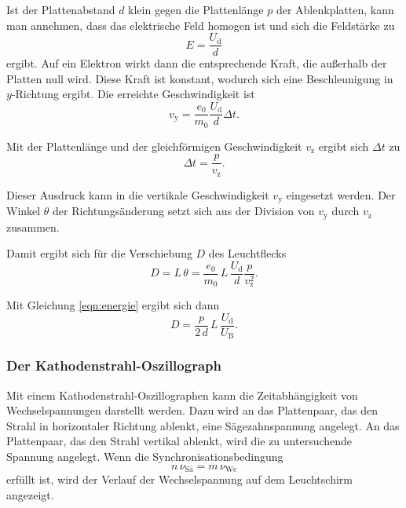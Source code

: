 \noindent Ist der Plattenabstand $d$ klein gegen die Plattenlänge $p$ 
der Ablenkplatten, kann man annehmen, dass das elektrische 
Feld homogen ist und sich die Feldstärke zu
\begin{equation*}
    E = \frac{U_\text{d}}{d}
\end{equation*} 
ergibt. Auf ein Elektron wirkt dann die entsprechende Kraft, 
die außerhalb der Platten null wird. Diese Kraft ist konstant, 
wodurch sich eine Beschleunigung in $y$-Richtung  
ergibt. 
Die erreichte Geschwindigkeit ist 
\begin{equation*}
    v_\text{y} = \frac{e_\text{0}}{m_\text{0}} \frac{U_\text{d}}{d} \Delta t.
\end{equation*}

\noindent Mit der Plattenlänge und der 
gleichförmigen Geschwindigkeit $v_\text{z}$ ergibt sich $\Delta t$ zu
\begin{equation*}
    \Delta t = \frac{p}{v_\text{z}}.
\end{equation*}

\noindent Dieser Ausdruck kann in die vertikale 
Geschwindigkeit $v_\text{y}$ eingesetzt werden. Der Winkel $\theta$ der 
Richtungsänderung setzt sich aus der Division von 
$v_\text{y}$ durch $v_\text{z}$ zusammen. 

\noindent Damit ergibt sich für die Verschiebung $D$ des Leuchtflecks 
\begin{equation*}
    D = L \, \theta = \frac{e_\text{0}}{m_\text{0}} \, L \, \frac{U_\text{d}}{d} \frac{p}{v_\text{z}^2}.
\end{equation*}

\noindent Mit Gleichung \eqref{eqn:energie} ergibt sich dann 
\begin{equation}
    D = \frac{p}{2\, d} \, L \, \frac{U_\text{d}}{U_\text{B}}.
    \label{eqn:leuchtfleck}
\end{equation}

\subsubsection{Der Kathodenstrahl-Oszillograph}
Mit einem Kathodenstrahl-Oszillographen kann die Zeitabhängigkeit
von Wechselspannungen darstellt werden.
Dazu wird an das Plattenpaar, das den Strahl in horizontaler
Richtung ablenkt, eine Sägezahnspannung angelegt. An das Plattenpaar,
das den Strahl vertikal ablenkt, wird die zu untersuchende
Spannung angelegt. Wenn die Synchronisationsbedingung
\begin{equation*}
    n \, \nu_\text{Sä} = m \, \nu_\text{We}
\end{equation*}
erfüllt ist, wird der Verlauf der Wechselspannung auf dem
Leuchtschirm angezeigt.


